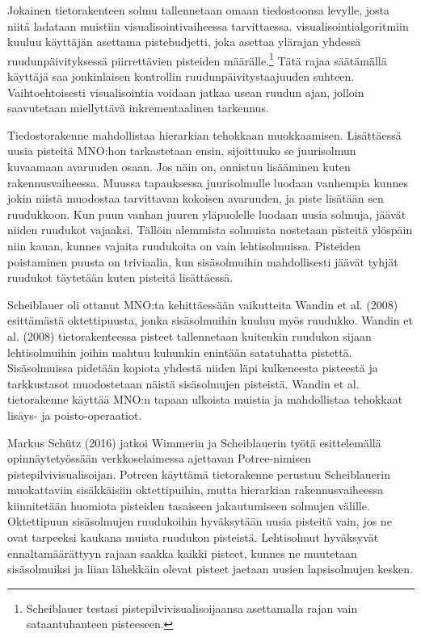 Jokainen tietorakenteen solmu tallennetaan omaan tiedostoonsa levylle, josta niitä ladataan muistiin visualisointivaiheessa tarvittaessa. visualisointialgoritmiin kuuluu käyttäjän asettama pistebudjetti, joka asettaa ylärajan yhdessä ruudunpäivityksessä piirrettävien pisteiden määrälle.\footnote{Scheiblauer testasi pistepilvivisualisoijaansa asettamalla rajan vain sataantuhanteen pisteeseen.} Tätä rajaa säätämällä käyttäjä saa jonkinlaisen kontrollin ruudunpäivitystaajuuden suhteen. Vaihtoehtoisesti visualisointia voidaan jatkaa usean ruudun ajan, jolloin saavutetaan miellyttävä inkrementaalinen tarkennus. \cite{scheiblauer}

Tiedostorakenne mahdollistaa hierarkian tehokkaan muokkaamisen. Lisättäessä uusia pisteitä MNO:hon tarkastetaan ensin, sijoittuuko se juurisolmun kuvaamaan avaruuden osaan. Jos näin on, onnistuu lisääminen kuten rakennusvaiheessa. Muussa tapauksessa juurisolmulle luodaan vanhempia kunnes jokin niistä muodostaa tarvittavan kokoisen avaruuden, ja piste lisätään sen ruudukkoon. Kun puun vanhan juuren yläpuolelle luodaan uusia solmuja, jäävät niiden ruudukot vajaaksi. Tällöin alemmista solmuista nostetaan pisteitä ylöspäin niin kauan, kunnes vajaita ruudukoita on vain lehtisolmuissa. Pisteiden poistaminen puusta on triviaalia, kun sisäsolmuihin mahdollisesti jäävät tyhjät ruudukot täytetään kuten pisteitä lisättäessä. \cite{scheiblauer}

Scheiblauer oli ottanut MNO:ta kehittäessään vaikutteita Wandin et al. (2008) esittämästä oktettipuusta, jonka sisäsolmuihin kuuluu myös ruudukko. Wandin et al. (2008) tietorakenteessa pisteet tallennetaan kuitenkin ruudukon sijaan lehtisolmuihin joihin mahtuu kuhunkin enintään satatuhatta pistettä. Sisäsolmuissa pidetään kopiota yhdestä niiden läpi kulkeneesta pisteestä ja tarkkustasot muodostetaan näistä sisäsolmujen pisteistä. Wandin et al. tietorakenne käyttää MNO:n tapaan ulkoista muistia ja mahdollistaa tehokkaat lisäys- ja poisto-operaatiot. \cite{wand}

Markus Schütz (2016) jatkoi Wimmerin ja Scheiblauerin työtä esittelemällä opinnäytetyössään verkkoselaimessa ajettavan Potree-nimisen pistepilvivisualisoijan. Potreen käyttämä tietorakenne perustuu Scheiblauerin muokattaviin sisäkkäisiin oktettipuihin, mutta hierarkian rakennusvaiheessa kiinnitetään huomiota pisteiden tasaiseen jakautumiseen solmujen välille. Oktettipuun sisäsolmujen ruudukoihin hyväksytään uusia pisteitä vain, jos ne ovat tarpeeksi kaukana muista ruudukon pisteistä. Lehtisolmut hyväksyvät ennaltamäärättyyn rajaan saakka kaikki pisteet, kunnes ne muutetaan sisäsolmuiksi ja liian lähekkäin olevat pisteet jaetaan uusien lapsisolmujen kesken. \cite{potree}

